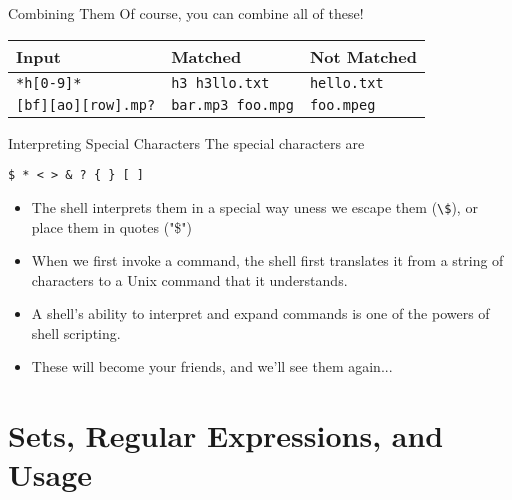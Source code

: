 \documentclass[11pt]{beamer}
\begin{document}
\begin{frame}[fragile]{Combining Them}
  Of course, you can combine all of these!

  \begin{center}
    {\small
    \begin{tabular}{|l|l|l|}
      \hline
      Input & Matched & Not Matched\\ \hline
      \texttt{*h[0-9]*} & \texttt{h3 h3llo.txt} & \texttt{hello.txt}\\ \hline
      \texttt{[bf][ao][row].mp?} & \texttt{bar.mp3 foo.mpg} & \texttt{foo.mpeg}\\ \hline
    \end{tabular}
    }
  \end{center}
\end{frame}

\begin{frame}[fragile]{Interpreting Special Characters}
  The special characters are
  \begin{center}
    \texttt{\$ * < > \& ? \{ \} [ ]}
  \end{center}
  \begin{itemize}[<+- | alert@+>]
    \item The shell interprets them in a special way uness we escape them (\texttt{\textbackslash\$}), or place
          them in quotes ("\$")
    \item When we first invoke a command, the shell first translates it from a string of characters to a Unix
          command that it understands.
    \item A shell's ability to interpret and expand commands is one of the powers of shell scripting.
    \item These will become your friends, and we'll see them again...
  \end{itemize}
\end{frame}

%

%
\section{Sets, Regular Expressions, and Usage}
\label{sec:sets_regular_expressions_and_usage}
\end{document}
